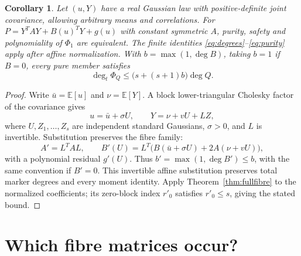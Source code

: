 \documentclass[11pt]{article}
\newtheorem{corollary}[theorem]{Corollary}
\theoremstyle{definition}\newtheorem{definition}[theorem]{Definition}
\theoremstyle{remark}\newtheorem{remark}[theorem]{Remark}
\newcommand{\E}{\mathbb E}
\begin{document}
\begin{corollary}\label{cor:affinegaussian}
Let $(u,Y)$ have a real Gaussian law with positive-definite joint
covariance, allowing arbitrary means and correlations. For
$P=Y^TAY+B(u)^TY+g(u)$ with constant symmetric $A$, purity, safety
and polynomiality of $\Phi_1$ are equivalent. The finite identities
\eqref{eq:degrees}--\eqref{eq:purity} apply after affine normalization.
With $b=\max(1,\deg B)$, taking $b=1$ if $B=0$, every pure member satisfies
\[
 \deg_t\Phi_Q\le\bigl(s+(s+1)b\bigr)\deg Q.
\]
\end{corollary}
\begin{proof}
Write $\bar u=\E[u]$ and $\nu=\E[Y]$. A block lower-triangular
Cholesky factor of the covariance gives
\[
 u=\bar u+\sigma U,\qquad Y=\nu+vU+LZ,
\]
where $U,Z_1,\ldots,Z_s$ are independent standard Gaussians,
$\sigma>0$, and $L$ is invertible. Substitution preserves the fibre family:
\[
 A'=L^TAL,\qquad
 B'(U)=L^T\bigl(B(\bar u+\sigma U)+2A(\nu+vU)\bigr),
\]
with a polynomial residual $g'(U)$. Thus $b'=\max(1,\deg B')\le b$,
with the same convention if $B'=0$. This invertible affine substitution
preserves total marker degrees and every moment identity. Apply
Theorem~\ref{thm:fullfibre} to the normalized coefficients; its zero-block
index $r'_0$ satisfies $r'_0\le s$, giving the stated bound.
\end{proof}

\section{Which fibre matrices occur?}
\end{document}

